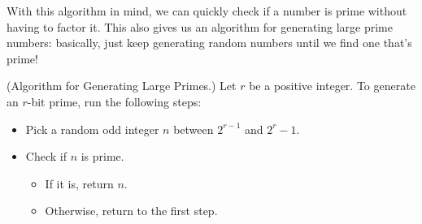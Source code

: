 \documentclass[letterpaper]{article}
\begin{document}
\bigskip 

With this algorithm in mind, we can quickly check if a number is prime without having to factor it. This also gives us an algorithm for generating large prime numbers: basically, just keep generating random numbers until we find one that's prime!
\begin{mdframed}
    (Algorithm for Generating Large Primes.) Let $r$ be a positive integer. To generate an $r$-bit prime, run the following steps: 
    \begin{itemize}
        \item Pick a random odd integer $n$ between $2^{r - 1}$ and $2^{r} - 1$. 
        \item Check if $n$ is prime. 
        \begin{itemize}
            \item If it is, return $n$. 
            \item Otherwise, return to the first step. 
        \end{itemize}
    \end{itemize}
\end{mdframed}
\end{document}
